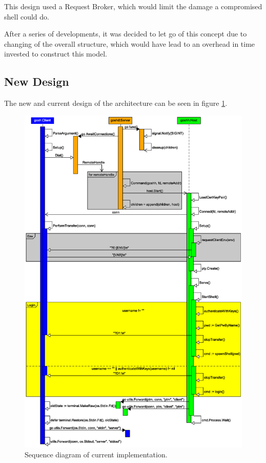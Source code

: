 \documentclass[10pt,a4paper,titlepage,twoside,english,final]{zhawreprt}
\begin{document}
This design used a \gls{Request Broker}, which would limit the damage a compromised shell could do.

After a series of developments, it was decided to let go of this concept due to changing of the overall structure, which would have lead to an overhead in time invested to construct this model.

\subsection{New Design}\label{ssec:NewDesign}
The new and current design of the architecture can be seen in figure \ref{fig:SeqDiaCurrent}.
\begin{figure}[ht]
\includegraphics[width=\textwidth]{SequenceDiagramNew}
\caption{Sequence diagram of current implementation.}
\label{fig:SeqDiaCurrent}
\end{figure}
\end{document}
